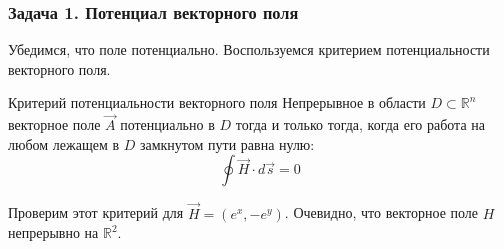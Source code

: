 \begin{frame}\frametitle{Задача 1. Потенциал векторного поля}
Убедимся, что поле потенциально.
Воспользуемся критерием потенциальности векторного поля.

\begin{block}{Критерий потенциальности векторного поля}
Непрерывное в области $D \subset \mathbb{R}^n$ векторное поле $\vec A$
потенциально в $D$ тогда и только тогда, когда его работа на любом лежащем в $D$
замкнутом пути равна нулю:
\[ \oint \vec H \cdot d \vec s = 0  \]
\end{block}

Проверим этот критерий для $\vec H = (e^x, - e^y)$.
Очевидно, что векторное поле $H$ непрерывно на $\mathbb{R}^2$.

\end{frame}   
